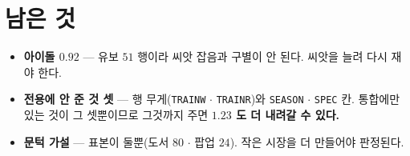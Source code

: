 \documentclass[11pt]{article}
\begin{document}
\section*{남은 것}

\begin{itemize}
\item \textbf{아이돌 $0.92$} --- 유보 $51$ 행이라 씨앗 잡음과 구별이 안
된다. 씨앗을 늘려 다시 재야 한다.
\item \textbf{전용에 안 준 것 셋} --- 행 무게(\texttt{TRAINW} $\cdot$
\texttt{TRAINR})와 \texttt{SEASON} $\cdot$ \texttt{SPEC} 칸. 통합에만 있는
것이 그 셋뿐이므로 그것까지 주면 \textbf{$1.23$ 도 더 내려갈 수 있다.}
\item \textbf{문턱 가설} --- 표본이 둘뿐(도서 $80$ $\cdot$ 팝업 $24$).
작은 시장을 더 만들어야 판정된다.
\end{itemize}
\end{document}
